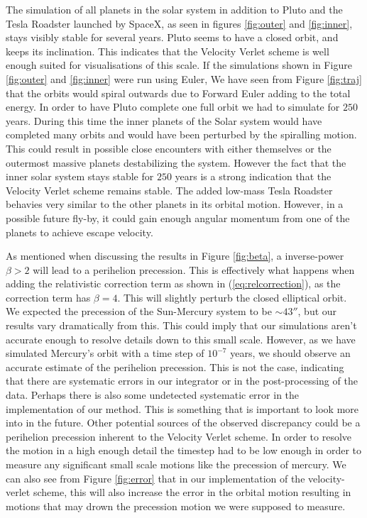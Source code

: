 \documentclass[twocolumn]{aastex62}
\begin{document}
The simulation of all planets in the solar system in addition to Pluto and 
the Tesla Roadster launched by SpaceX, as seen in figures \ref{fig:outer} and \ref{fig:inner}, stays visibly stable for several years. Pluto seems to 
have a closed orbit, and keeps its inclination. This indicates that 
the Velocity Verlet scheme is well enough suited for visualisations of this scale. 
If the simulations shown in Figure \ref{fig:outer} and \ref{fig:inner} 
were run using Euler, We have seen from Figure \ref{fig:traj} that the orbits would spiral outwards due to Forward Euler adding to the total energy. In order to have Pluto complete one full orbit we had to simulate for $250$ years. During this time the inner planets of the Solar system would have completed many orbits and would have been perturbed by the spiralling motion. This could result in possible close encounters with either themselves or the outermost massive planets destabilizing the system. However the fact that the inner solar system stays stable for $250$ years is a strong indication that the Velocity Verlet scheme remains stable. The added low-mass Tesla Roadster behavies very similar to the other planets in its orbital motion. However, in a possible future fly-by, it could gain enough angular momentum from one of the planets to achieve escape velocity.

As mentioned when discussing the results in Figure \ref{fig:beta}, a 
inverse-power $\beta>2$ will lead to a perihelion precession. This is effectively 
what happens when adding the relativistic correction term as shown in 
(\ref{eq:relcorrection}), as the correction term has $\beta=4$. This 
will slightly perturb the closed elliptical orbit.
We expected the precession of the Sun-Mercury system to be $\sim 43''$, 
but our results vary dramatically from this. This could imply that our 
simulations aren't accurate enough to resolve details down to this small 
scale. However, as we have simulated Mercury's orbit with a time step of 
$10^{-7}$ years, we should observe an accurate estimate of the perihelion 
precession. This is not the case, indicating that there are systematic 
errors in our integrator or in the post-processing of the data. Perhaps 
there is also some undetected systematic error in the implementation of 
our method. This is something that is important to look 
more into in the future. Other potential sources of the observed 
discrepancy could be a perihelion precession inherent to the Velocity 
Verlet scheme. In order to resolve the motion in a high enough detail the 
timestep had to be low enough in order to measure any significant small 
scale motions like the precession of mercury. We can also see from Figure 
\ref{fig:error} that in our implementation of the velocity-verlet scheme, 
this will also increase the error in the orbital motion resulting in 
motions that may drown the precession motion we were supposed to measure.
\end{document}
